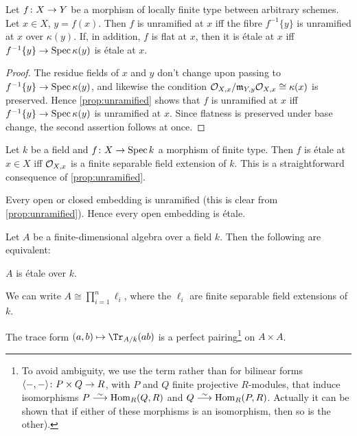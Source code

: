 \documentclass[a4paper, 10pt, oneside, DIV=9, chapterprefix=true, numbers=enddot, bibliography=totoc]{scrbook}
\begin{document}
\begin{fact}\label{fact:etaleFibres}
	Let $f\colon X\morphism Y$ be a morphism of locally finite type between arbitrary schemes. Let $x\in X$, $y=f(x)$. Then $f$ is unramified at $x$ iff the fibre $f^{-1}\{y\}$ is unramified at $x$ over $\kappa(y)$. If, in addition, $f$ is flat at $x$, then it is étale at $x$ iff $f^{-1}\{y\}\morphism\Spec \kappa(y)$ is étale at $x$.
\end{fact}
\begin{proof}
	The residue fields of $x$ and $y$ don't change upon passing to $f^{-1}\{y\}\morphism\Spec\kappa(y)$, and likewise the condition $\mathcal{O}_{X,x}/\mathfrak{m}_{Y,y}\mathcal{O}_{X,x}\cong \kappa(x)$ is preserved. Hence \cref{prop:unramified} shows that $f$ is unramified at $x$ iff $f^{-1}\{y\}\morphism\Spec\kappa(y)$ is unramified at $x$. Since flatness is preserved under base change, the second assertion follows at once.
\end{proof}
\begin{exm}\label{exm:embeddings}
	\begin{alphanumerate}
		\item Let $k$ be a field and $f\colon X\morphism \Spec k$ a morphism of finite type. Then $f$ is étale at $x\in X$ iff $\mathcal{O}_{X,x}$ is a finite separable field extension of $k$. This is a straightforward consequence of \cref{prop:unramified}.
		\item Every open or closed embedding is unramified (this is clear from \cref{prop:unramified}). Hence every open embedding is étale.
	\end{alphanumerate}
\end{exm}
\begin{lem}\label{lem:etaleTrace}
	Let $A$ be a finite-dimensional algebra over a field $k$. Then the following are equivalent:
	\begin{alphanumerate}
		\item $A$ is étale over $k$.
		\item We can write $A\cong \prod_{i=1}^{n}\ell_i$, where the $\ell_i$ are finite separable field extensions of $k$.
		\item The trace form $(a,b)\mapsto \Tr_{A/k}(ab)$ is a perfect pairing\footnote{To avoid ambiguity, we use the term  rather than  for  bilinear forms $\langle -,-\rangle\colon P\times Q\morphism R$, with $P$ and $Q$ finite projective $R$-modules, that induce isomorphisms $P\isomorphism\Hom_R(Q,R)$ and $Q\isomorphism \Hom_R(P,R)$. Actually it can be shown that if either of these morphisms is an isomorphism, then so is the other).} on $A\times A$.
	\end{alphanumerate}
\end{lem}
\end{document}
